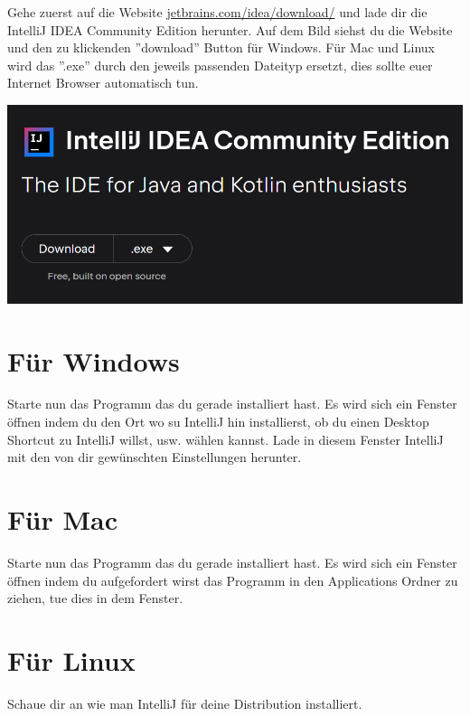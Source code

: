
\label{ex1}
Gehe zuerst auf die Website \href{\intellijurl}{jetbrains.com/idea/download/} und lade dir die IntelliJ IDEA Community Edition herunter. Auf dem Bild siehst du die Website und den zu klickenden ''download'' Button für Windows. Für Mac und Linux wird das ''.exe'' durch den jeweils passenden Dateityp ersetzt, dies sollte euer Internet Browser automatisch tun.
\begin{center}
    \includegraphics[width=\linewidth]{./3/IntelliJ download site.PNG}
\end{center}
\section*{Für Windows}
Starte nun das Programm das du gerade installiert hast. Es wird sich ein Fenster öffnen indem du den Ort wo su IntelliJ hin installierst, ob du einen Desktop Shortcut zu IntelliJ willst, usw. wählen kannst. Lade in diesem Fenster IntelliJ mit den von dir gewünschten Einstellungen herunter.\newline

\section*{Für Mac}
Starte nun das Programm das du gerade installiert hast. Es wird sich ein Fenster öffnen indem du aufgefordert wirst das Programm in den Applications Ordner zu ziehen, tue dies in dem Fenster.\newline

\section*{Für Linux}
Schaue dir an wie man IntelliJ für deine Distribution installiert.

